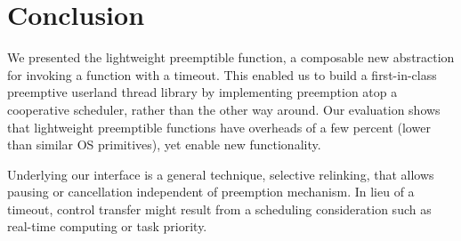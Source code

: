 \section{Conclusion}

We presented the lightweight preemptible function, a composable new abstraction
for invoking a function with a timeout.  This enabled us to build a first-in-class
preemptive userland thread library by implementing preemption atop a cooperative
scheduler, rather than the other way around.  Our evaluation shows that lightweight
preemptible functions have overheads of a few percent (lower than similar OS
primitives), yet enable new functionality.

Underlying our interface is a general technique, selective relinking, that allows
pausing or cancellation independent of preemption mechanism.  In lieu of a timeout,
control transfer might result from a scheduling consideration such as real-time
computing or task priority.
